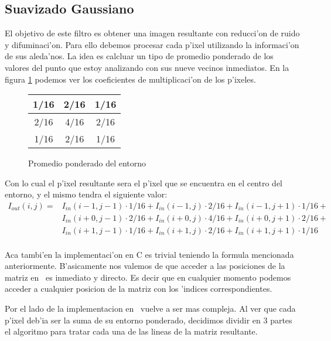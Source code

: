 \subsection{Suavizado Gaussiano}

El objetivo de este filtro es obtener una imagen resultante con reducci'on de ruido y difuminaci'on. 
Para ello debemos procesar cada p'ixel utilizando la informaci'on de sus aleda'nos. La idea es calcluar un tipo de promedio ponderado de los valores del punto que estoy analizando con sus nueve vecinos inmediatos. En la figura \ref{tab:s-uno} podemos ver los coeficientes de multiplicaci'on de los p'ixeles.

\begin{figure}[h!]
\begin{center}
\begin{tabular}{| c | c | c |}
\hline
1/16 & 2/16 & 1/16 \\ \hline
2/16 & 4/16 & 2/16 \\ \hline
1/16 & 2/16 & 1/16 \\ \hline
\end{tabular}
\end{center}
\caption{Promedio ponderado del entorno}
\label{tab:s-uno}
\end{figure}

Con lo cual el p'ixel resultante sera el p'ixel que se encuentra en el centro del entorno, y el mismo tendra el siguiente valor:
\\
$$
\begin{array}{rl}
I_{out}(i,j) =& I_{in}(i-1,j-1) \cdot{} 1/16 + I_{in}(i-1,j) \cdot{} 2/16 + I_{in}(i-1,j+1) \cdot{} 1/16 +\\
		 & I_{in}(i+0,j-1) \cdot{} 2/16 + I_{in}(i+0,j)  \cdot{} 4/16 +  I_{in}(i+0,j+1)  \cdot{} 2/16 +\\
		 & I_{in}(i+1,j-1)  \cdot{} 1/16 + I_{in}(i+1,j) \cdot{} 2/16 + I_{in}(i+1,j+1)  \cdot{} 1/16

\end{array}
$$
\\
Aca tambi'en la implementaci'on en C es trivial teniendo la formula mencionada anteriormente. B'asicamente nos valemos de que acceder a las posiciones de la matriz en \C\ es inmediato y directo. Es decir que en cualquier momento podemos acceder a cualquier posicion de la matriz con los 'indices correspondientes. 

Por el lado de la implementacion en \ass\ vuelve a ser mas compleja. Al ver que cada p'ixel deb'ia ser la suma de su entorno ponderado, decidimos 
dividir en 3 partes el algoritmo para tratar cada una de las lineas de la matriz resultante.

